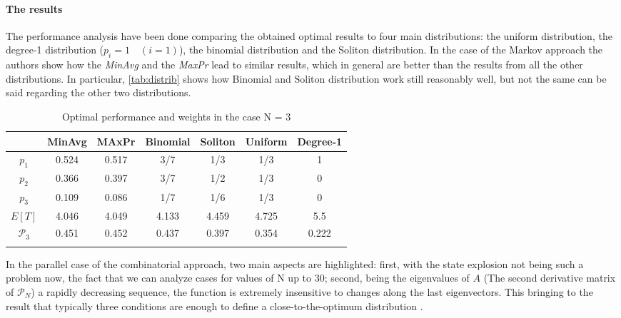 \paragraph{The results}
The performance analysis have been done comparing the obtained optimal results to four main distributions: the uniform distribution, the degree-1 distribution ($p_i = 1 \quad (i=1)$), the binomial distribution and the Soliton distribution. In the case of the Markov approach the authors show how the \textit{MinAvg} and the \textit{MaxPr} lead to similar results, which in general are better than the results from all the other distributions. In particular, \autoref{tab:distrib} shows how Binomial and Soliton distribution work still reasonably well, but not the same can be said regarding the other two distributions.
\begin{table}
\centering
\begin{tabular}{ccccccc}
\firsthline
& MinAvg & MAxPr & Binomial & Soliton & Uniform & Degree-1\\
\hline
$p_1$ & 0.524 & 0.517 & 3/7 & 1/3 & 1/3 & 1\\
$p_2$ & 0.366 & 0.397 & 3/7 & 1/2 & 1/3 & 0\\
$p_3$ & 0.109 & 0.086 &  1/7 & 1/6 & 1/3 & 0\\
\hline
$E[T]$ & 4.046 & 4.049 & 4.133 & 4.459 & 4.725 & 5.5\\
$\mathcal{P}_3$ & 0.451 & 0.452 & 0.437 & 0.397 & 0.354 & 0.222\\
\lasthline
\end{tabular}
  \caption{Optimal performance and weights in the case N = 3}
  \label{tab:distrib}
\end{table}
In the parallel case of the combinatorial approach, two main aspects are highlighted: first, with the state explosion not being such a problem now, the fact that we can analyze cases for values of N up to $30$; second, being the eigenvalues of $A$ (The second derivative matrix of $\mathcal{P}_N$) a rapidly decreasing sequence, the function is extremely insensitive to changes along the last eigenvectors. This bringing to the result that typically three conditions are enough to define a close-to-the-optimum distribution \cite{Hyytia2007}.

